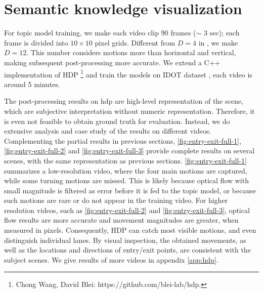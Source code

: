 \section{Semantic knowledge visualization}
\label{sec:hdp-res}

For topic model training, we make each video clip 90 frames ($\sim$ 3 sec); each frame is divided into $10\times10$ pixel grids. Different from $D=4$ in \cite{wang2009unsupervised,kuettel2010s}, we make $D=12$. This number considers motions more than horizontal and vertical, making subsequent post-processing more accurate. 
We extend a C++ implementation of HDP \footnote{Chong Wang, David Blei: https://github.com/blei-lab/hdp.} and train the models on IDOT dataset \cite{yanziVehicleTracker}, each video is around 5 minutes. 

The post-processing results on \gls{hdp} are high-level representation of the scene, which are subjective interpretation without numeric representation.
Therefore, it is even not feasible to obtain ground truth for evaluation.
Instead, we do extensive analysis and case study of the results on different videos.
Complementing the partial results in previous sections, \ref{fig:entry-exit-full-1}, \ref{fig:entry-exit-full-2} and \ref{fig:entry-exit-full-3} provide complete results on several scenes, 
with the same representation as previous sections.
\ref{fig:entry-exit-full-1} summarizes a low-resolution video, where the four main motions are captured, while some turning motions are missed. 
This is likely because optical flow with small magnitude is filtered as error before it is fed to the topic model, or because such motions are rare or do not appear in the training video.
For higher resolution videos, such as \ref{fig:entry-exit-full-2} and \ref{fig:entry-exit-full-3}, optical flow results are more accurate and movement magnitudes are greater, when measured in pixels. 
Consequently, HDP can catch most visible motions, and even distinguish individual lanes.
By visual inspection, the obtained movements, as well as the locations and directions of entry/exit points, are consistent with the subject scenes. 
We give results of more videos in appendix \ref{app:hdp}.
